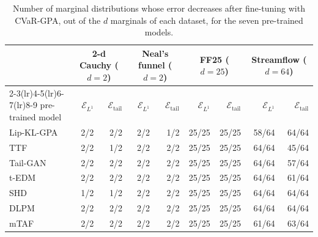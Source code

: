 \begin{table}[t]
\centering\small\setlength{\tabcolsep}{3.5pt}
\caption{Number of marginal distributions whose error decreases after fine-tuning with CVaR-GPA, out of the $d$ marginals of each dataset, for the seven pre-trained models.}
\label{tab:marg_counts}
\begin{tabular}{l rr rr rr rr}\toprule
 & \multicolumn{2}{c}{2-d Cauchy ($d=2$)} & \multicolumn{2}{c}{Neal's funnel ($d=2$)} & \multicolumn{2}{c}{FF25 ($d=25$)} & \multicolumn{2}{c}{Streamflow ($d=64$)}\\
\cmidrule(lr){2-3}\cmidrule(lr){4-5}\cmidrule(lr){6-7}\cmidrule(lr){8-9}
pre-trained model & $\mathcal{E}_{L^1}$ & $\mathcal{E}_{\mathrm{tail}}$ & $\mathcal{E}_{L^1}$ & $\mathcal{E}_{\mathrm{tail}}$ & $\mathcal{E}_{L^1}$ & $\mathcal{E}_{\mathrm{tail}}$ & $\mathcal{E}_{L^1}$ & $\mathcal{E}_{\mathrm{tail}}$\\ \midrule
Lip-KL-GPA & 2/2 & 2/2 & 2/2 & 1/2 & 25/25 & 25/25 & 58/64 & 64/64\\
TTF & 2/2 & 1/2 & 2/2 & 2/2 & 25/25 & 25/25 & 64/64 & 45/64\\
Tail-GAN & 2/2 & 2/2 & 2/2 & 2/2 & 25/25 & 25/25 & 64/64 & 57/64\\
t-EDM & 2/2 & 2/2 & 2/2 & 2/2 & 25/25 & 25/25 & 64/64 & 61/64\\
SHD & 1/2 & 1/2 & 2/2 & 2/2 & 25/25 & 25/25 & 64/64 & 64/64\\
DLPM & 2/2 & 2/2 & 2/2 & 2/2 & 25/25 & 25/25 & 64/64 & 64/64\\
mTAF & 2/2 & 2/2 & 2/2 & 2/2 & 25/25 & 25/25 & 61/64 & 63/64\\
\bottomrule\end{tabular}
\end{table}
